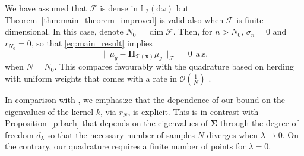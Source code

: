 \documentclass[twoside,11pt]{book}
\numberwithin{theorem}{chapter}
\numberwithin{definition}{chapter}
\numberwithin{proposition}{chapter}
\numberwithin{corollary}{chapter}
\numberwithin{example}{chapter}
\numberwithin{lemma}{chapter}
\begin{document}


We have assumed that $\mathcal{F}$ is dense in $\mathbb{L}_{2}(\mathrm{d}\omega)$ but Theorem~\ref{thm:main_theorem_improved} is valid also when $\mathcal{F}$ is finite-dimensional. In this case, denote $N_{0} = \dim \mathcal{F}$. Then, for $n > N_{0}$, $\sigma_{n} = 0$ and $r_{N_{0}} = 0$, so that \eqref{eq:main_result} implies
\begin{equation}
  \| \mu_{g} - \bm{\Pi}_{\mathcal{T}(\bm{x})}\mu_{g}\|_{\mathcal{F}}= 0 \:\: \text{a.s.}
\end{equation}
when $N= N_0$.
This compares favourably with the quadrature based on herding with uniform weights that comes with a rate in $\mathcal{O}(\frac{1}{N})$  \cite{BaLaOb12,ChWeSm10}. 






In comparison with \cite{Bac17}, we emphasize that the dependence of our bound on the eigenvalues of the kernel $k$, via $r_{N}$, is explicit. This is in contrast with Proposition~\ref{p:bach} that depends on the eigenvalues of $\bm{\Sigma}$ through the degree of freedom $d_{\lambda}$ so that the necessary number of samples $N$ diverges when $\lambda \rightarrow 0$. On the contrary, our quadrature requires a finite number of points for $\lambda =0$. 
\end{document}
